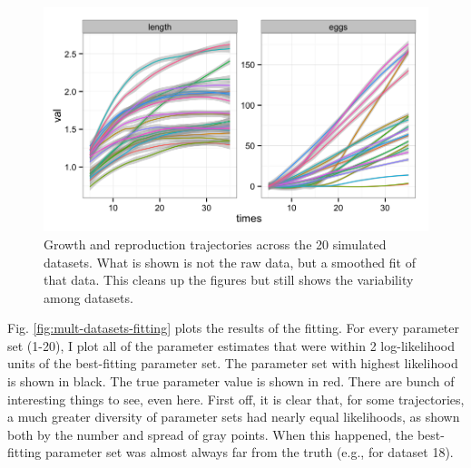 \documentclass[12pt,reqno,final,pdftex]{amsart}\usepackage[]{graphicx}\usepackage[]{color}
\newenvironment{knitrout}{}{} %
\theoremstyle{plain}
\numberwithin{equation}{part}
\begin{document}
\begin{knitrout}\scriptsize
{}\color{fgcolor}\begin{figure}

\includegraphics[width=\linewidth]{figure/sim-datasets-1} \hfill{}

\caption[Growth and reproduction trajectories across the 20 simulated datasets]{Growth and reproduction trajectories across the 20 simulated datasets. What is shown is not the raw data, but a smoothed fit of that data. This cleans up the figures but still shows the variability among datasets.}\label{fig:sim-datasets}
\end{figure}


\end{knitrout}

Fig. \ref{fig:mult-datasets-fitting} plots the results of the fitting.
For every parameter set (1-20), I plot all of the parameter estimates that were within 2 log-likelihood units of the best-fitting parameter set.
The parameter set with highest likelihood is shown in black.
The true parameter value is shown in red.
There are bunch of interesting things to see, even here.
First off, it is clear that, for some trajectories, a much greater diversity of parameter sets had nearly equal likelihoods, as shown both by the number and spread of gray points.
When this happened, the best-fitting parameter set was almost always far from the truth (e.g., for dataset 18).
\end{document}
